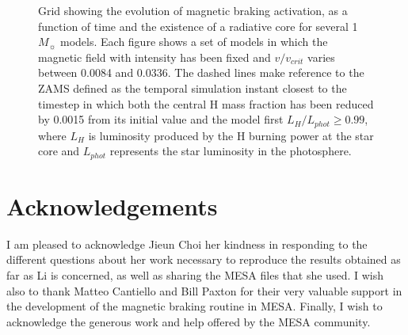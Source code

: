 \documentclass[fleqn,usenatbib]{mnras}
\begin{document}
\begin{figure}
\begin{subfigure}[h]{0.47\textwidth}
    \label{fig:subim36}
    \end{subfigure}
\caption{Grid showing the evolution of magnetic braking activation, as a function of time and the existence of a radiative core for several 1 $M_{\sun}$ models. Each figure shows a set of models in which the magnetic field with intensity has been fixed and $v/v_{crit}$ varies between 0.0084 and 0.0336. The dashed lines make reference to the ZAMS defined as the temporal simulation instant closest to the timestep in which both the central H mass fraction has been reduced by 0.0015 from its initial value and the model first $L_H/L_{phot} \geq 0.99$, where $L_{H}$ is luminosity produced by the H burning power at the star core and $L_{phot}$ represents the star luminosity in the photosphere.}
\label{fig:image32}
\end{figure}




\section*{Acknowledgements}
I am pleased to acknowledge Jieun Choi her kindness in responding to the different questions about her work necessary to reproduce the results obtained as far as Li is concerned, as well as sharing the MESA files that she used. I wish also to thank Matteo Cantiello and Bill Paxton for their very valuable support in the development of the magnetic braking routine in MESA. Finally, I wish to acknowledge the generous work and help offered by the MESA community.












\bsp	%
\label{lastpage}
\end{document}
